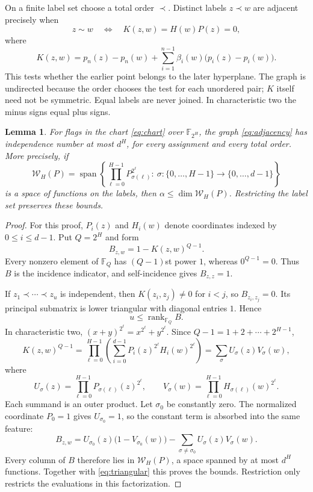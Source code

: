 \documentclass[11pt,a4paper]{article}
\newcommand{\F}{\mathbb F}
\newcommand{\Wcal}{\mathcal W}
\DeclareMathOperator{\rank}{rank}
\DeclareMathOperator{\spanop}{span}
\newtheorem{lemma}[theorem]{Lemma}
\theoremstyle{definition}
\theoremstyle{remark}
\numberwithin{equation}{section}
\begin{document}
On a finite label set choose a total order $\prec$. Distinct labels $z\prec w$ are adjacent precisely when
\begin{equation}\label{eq:adjacency}
z\sim w\quad\Longleftrightarrow\quad K(z,w)=H(w)P(z)=0,
\end{equation}
where
\begin{equation}\label{eq:kernel}
K(z,w)=p_n(z)-p_n(w)+\sum_{i=1}^{n-1}\beta_i(w)\bigl(p_i(z)-p_i(w)\bigr).
\end{equation}
This tests whether the earlier point belongs to the later hyperplane. The graph is undirected because the order chooses the test for each unordered pair; $K$ itself need not be symmetric. Equal labels are never joined. In characteristic two the minus signs equal plus signs.

\begin{lemma}\label{lem:rank}
For flags in the chart \eqref{eq:chart} over $\F_{2^H}$, the graph \eqref{eq:adjacency} has independence number at most $d^H$, for every assignment and every total order. More precisely, if
\begin{equation}\label{eq:feature-space}
\Wcal_H(P)=\spanop\left\{
\prod_{\ell=0}^{H-1}P_{\sigma(\ell)}^{2^\ell}:\
\sigma:\{0,\ldots,H-1\}\longrightarrow\{0,\ldots,d-1\}
\right\}
\end{equation}
is a space of functions on the labels, then $\alpha\le\dim\Wcal_H(P)$. Restricting the label set preserves these bounds.
\end{lemma}

\begin{proof}
For this proof, $P_i(z)$ and $H_i(w)$ denote coordinates indexed by $0\le i\le d-1$. Put $Q=2^H$ and form
\[
B_{z,w}=1-K(z,w)^{Q-1}.
\]
Every nonzero element of $\F_Q$ has $(Q-1)$st power $1$, whereas $0^{Q-1}=0$. Thus $B$ is the incidence indicator, and self-incidence gives $B_{z,z}=1$.

If $z_1\prec\cdots\prec z_u$ is independent, then $K(z_i,z_j)\ne0$ for $i<j$, so $B_{z_i,z_j}=0$. Its principal submatrix is lower triangular with diagonal entries $1$. Hence
\begin{equation}\label{eq:triangular}
u\le\rank_{\F_Q}B.
\end{equation}
In characteristic two, $(x+y)^{2^\ell}=x^{2^\ell}+y^{2^\ell}$. Since $Q-1=1+2+\cdots+2^{H-1}$,
\begin{equation}\label{eq:frobenius-factor}
K(z,w)^{Q-1}=
\prod_{\ell=0}^{H-1}\left(\sum_{i=0}^{d-1}P_i(z)^{2^\ell}H_i(w)^{2^\ell}\right)
=\sum_\sigma U_\sigma(z)V_\sigma(w),
\end{equation}
where
\[
U_\sigma(z)=\prod_{\ell=0}^{H-1}P_{\sigma(\ell)}(z)^{2^\ell},\qquad
V_\sigma(w)=\prod_{\ell=0}^{H-1}H_{\sigma(\ell)}(w)^{2^\ell}.
\]
Each summand is an outer product. Let $\sigma_0$ be constantly zero. The normalized coordinate $P_0=1$ gives $U_{\sigma_0}=1$, so the constant term is absorbed into the same feature:
\[
B_{z,w}=U_{\sigma_0}(z)\bigl(1-V_{\sigma_0}(w)\bigr)
-\sum_{\sigma\ne\sigma_0}U_\sigma(z)V_\sigma(w).
\]
Every column of $B$ therefore lies in $\Wcal_H(P)$, a space spanned by at most $d^H$ functions. Together with \eqref{eq:triangular} this proves the bounds. Restriction only restricts the evaluations in this factorization.
\end{proof}
\end{document}

